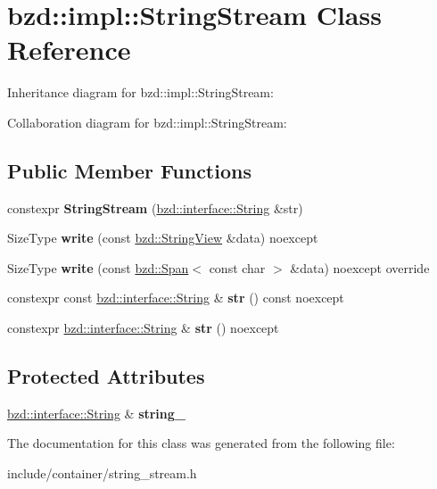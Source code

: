 \hypertarget{classbzd_1_1impl_1_1StringStream}{}\section{bzd\+:\+:impl\+:\+:String\+Stream Class Reference}
\label{classbzd_1_1impl_1_1StringStream}


Inheritance diagram for bzd\+:\+:impl\+:\+:String\+Stream\+:


Collaboration diagram for bzd\+:\+:impl\+:\+:String\+Stream\+:
\subsection*{Public Member Functions}
\begin{DoxyCompactItemize}
\item 
\mbox{\label{classbzd_1_1impl_1_1StringStream_a3d157030df98671100a8471197139c4a}} 
constexpr {\bfseries String\+Stream} (\hyperlink{classbzd_1_1impl_1_1String}{bzd\+::interface\+::\+String} \&str)
\item 
\mbox{\label{classbzd_1_1impl_1_1StringStream_af56d18b5a5a3bf47f5f96c895a4a05d4}} 
Size\+Type {\bfseries write} (const \hyperlink{classbzd_1_1impl_1_1StringView}{bzd\+::\+String\+View} \&data) noexcept
\item 
\mbox{\label{classbzd_1_1impl_1_1StringStream_a764ec9d25703589cc9086c5968b852d5}} 
Size\+Type {\bfseries write} (const \hyperlink{classbzd_1_1Span}{bzd\+::\+Span}$<$ const char $>$ \&data) noexcept override
\item 
\mbox{\label{classbzd_1_1impl_1_1StringStream_a62f8401f8b7e9aa09667a1a9c72aba11}} 
constexpr const \hyperlink{classbzd_1_1impl_1_1String}{bzd\+::interface\+::\+String} \& {\bfseries str} () const noexcept
\item 
\mbox{\label{classbzd_1_1impl_1_1StringStream_a034aae75a0c5cbeb40f6110be19fe659}} 
constexpr \hyperlink{classbzd_1_1impl_1_1String}{bzd\+::interface\+::\+String} \& {\bfseries str} () noexcept
\end{DoxyCompactItemize}
\subsection*{Protected Attributes}
\begin{DoxyCompactItemize}
\item 
\mbox{\label{classbzd_1_1impl_1_1StringStream_a9ff78bc8c62001daf63a4f06c60cf7a7}} 
\hyperlink{classbzd_1_1impl_1_1String}{bzd\+::interface\+::\+String} \& {\bfseries string\+\_\+}
\end{DoxyCompactItemize}


The documentation for this class was generated from the following file\+:\begin{DoxyCompactItemize}
\item 
include/container/string\+\_\+stream.\+h\end{DoxyCompactItemize}
